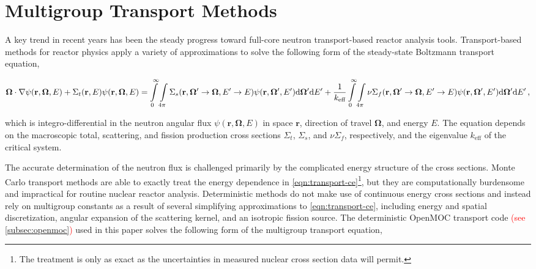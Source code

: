 \section{Multigroup Transport Methods}
\label{sec:mg-theory}

A key trend in recent years has been the steady progress toward full-core neutron transport-based reactor analysis tools. Transport-based methods for reactor physics apply a variety of approximations to solve the following form of the steady-state Boltzmann transport equation,

\begin{dmath}
\label{eqn:transport-ce}
\mathbf{\Omega} \cdot \nabla \psi(\mathbf{r},\mathbf{\Omega},E) + \Sigma_{t}(\mathbf{r},E)\psi(\mathbf{r},\mathbf{\Omega},E) = \int\displaylimits_{0}^{\infty}\int\displaylimits_{4\pi} \Sigma_{s}(\mathbf{r},{\mathbf{\Omega'}\rightarrow\mathbf{\Omega}},{E'\rightarrow E}) \psi(\mathbf{r},\mathbf{\Omega'},E') \mathrm{d}\mathbf{\Omega'} \mathrm{d}E' + \frac{1}{k_{\textrm{eff}}}\int\displaylimits_{0}^{\infty}\int\displaylimits_{4\pi} \nu\Sigma_{f}(\mathbf{r},{\mathbf{\Omega'}\rightarrow \mathbf{\Omega}},{E'\rightarrow E})\psi(\mathbf{r},\mathbf{\Omega'},E') \mathrm{d}\mathbf{\Omega'} \mathrm{d}E'\,,
\end{dmath}

\noindent which is integro-differential in the neutron angular flux $\psi(\mathbf{r},\mathbf{\Omega},E)$ in space $\mathbf{r}$, direction of travel $\mathbf{\Omega}$, and energy $E$. The equation depends on the macroscopic total, scattering, and fission production cross sections $\Sigma_{t}$, $\Sigma_{s}$, and $\nu\Sigma_{f}$, respectively, and the eigenvalue $k_{\textrm{eff}}$ of the critical system.

The accurate determination of the neutron flux is challenged primarily by the complicated energy structure of the cross sections. Monte Carlo transport methods are able to exactly treat the energy dependence in \cref{eqn:transport-ce}\footnote{The treatment is only as exact as the uncertainties in measured nuclear cross section data will permit.}, but they are computationally burdensome and impractical for routine nuclear reactor analysis. Deterministic methods do not make use of continuous energy cross sections and instead rely on multigroup constants as a result of several simplifying approximations to \cref{eqn:transport-ce}, including energy and spatial discretization, angular expansion of the scattering kernel, and an isotropic fission source. The deterministic OpenMOC transport code \textcolor{red}{(see \cref{subsec:openmoc})} used in this paper solves the following form of the multigroup transport equation,

